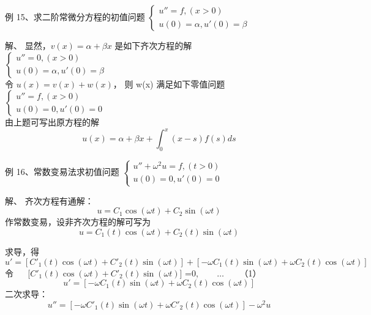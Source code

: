 \begin{frame}
	\begin{exampleblock} {例 15、求二阶常微分方程的初值问题}
	$\begin{cases}
		u'' =f, (x>0)\\
		u(0)=\alpha, u'(0)=\beta
	\end{cases}$
	\end{exampleblock}
	\alert{解、}  显然，$v(x)=\alpha+\beta x$ 是如下齐次方程的解\\
		$\begin{cases}
			u'' =0, (x>0)\\
			u(0)=\alpha, u'(0)=\beta
		\end{cases}$\\
		令 $u(x)=v(x)+w(x)$， 则 w(x) 满足如下零值问题\\	
		$\begin{cases}
			u'' =f, (x>0)\\
			u(0)=0, u'(0)=0
		\end{cases}$\\	  
		由上题可写出原方程的解\\
		\begin{equation*}
			u(x)=\alpha+\beta x + \int_{0}^{x} (x-s)f(s) ds 
		\end{equation*}      
\end{frame}

\begin{frame}
	\begin{exampleblock} {例 16、常数变易法求初值问题}
	$\begin{cases}
		u'' +\omega ^2 u =f, (t>0)\\
		u(0)=0, u'(0)=0
	\end{cases}$
	\end{exampleblock}
	\alert{解、} 齐次方程有通解：
	\begin{equation*}
		u=C_1 \cos(\omega t)+C_2 \sin(\omega t)
	\end{equation*}     
	作常数变易，设非齐次方程的解可写为 
	\begin{equation*}
		u=C_1(t) \cos(\omega t)+C_2(t) \sin(\omega t)
	\end{equation*}    
\end{frame}

\begin{frame}
	求导，得
	\begin{equation*}
		u'=[C'_1(t) \cos(\omega t)+C'_2(t) \sin(\omega t)] + [  - \omega C_1(t) \sin(\omega t)+ \omega C_2(t) \cos(\omega t)  ]
	\end{equation*}    
	令 ~~ [$C'_1(t) \cos(\omega t)+C'_2(t) \sin(\omega t)$] =0,  ~~~ $\dots$  ~~~（1）\\
	\begin{equation*}
		u'= [  - \omega C_1(t) \sin(\omega t)+ \omega C_2(t) \cos(\omega t)  ]
	\end{equation*}    
	二次求导：
	\begin{equation*}
		u''= [  - \omega C'_1(t) \sin(\omega t)+ \omega C'_2(t) \cos(\omega t)  ] -\omega^2 u
	\end{equation*}  
\end{frame}

